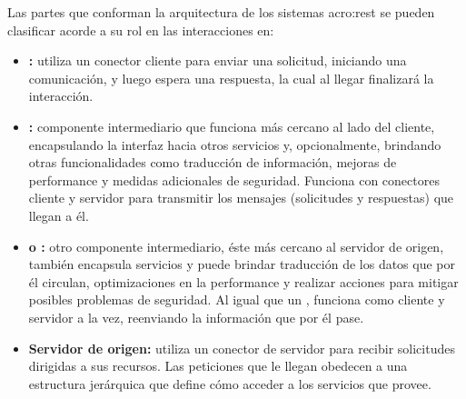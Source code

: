 Las partes que conforman la arquitectura de los sistemas \gls{acro:rest} se pueden clasificar acorde a su rol en las interacciones en:

\begin{itemize}
  \item \textbf{:} utiliza un conector cliente para enviar una solicitud, iniciando una comunicación, y luego espera una respuesta, la cual al llegar finalizará la interacción.

  \item \textbf{:} componente intermediario que funciona más cercano al lado del cliente, encapsulando la interfaz hacia otros servicios y, opcionalmente, brindando otras funcionalidades como traducción de información, mejoras de performance y medidas adicionales de seguridad. Funciona con conectores cliente y servidor para transmitir los mensajes (solicitudes y respuestas) que llegan a él.

  \item \textbf{ o :} otro componente intermediario, éste más cercano al servidor de origen, también encapsula servicios y puede brindar traducción de los datos que por él circulan, optimizaciones en la performance y realizar acciones para mitigar posibles problemas de seguridad. Al igual que un , funciona como cliente y servidor a la vez, reenviando la información que por él pase.

  \item \textbf{Servidor de origen:} utiliza un conector de servidor para recibir solicitudes dirigidas a sus recursos. Las peticiones que le llegan obedecen a una estructura jerárquica que define cómo acceder a los servicios que provee.
\end{itemize}
